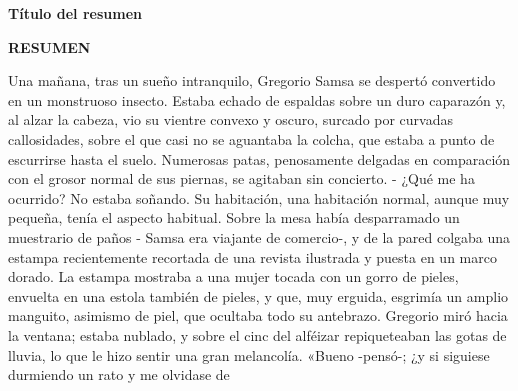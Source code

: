 \begin{center}
{\Large \bfseries Título del resumen}

\vspace{1cm}
{\Large \bfseries RESUMEN}

\vspace{2.5cm}
\end{center}


Una mañana, tras un sueño intranquilo, Gregorio Samsa se despertó convertido en un monstruoso insecto. Estaba echado de espaldas sobre un duro caparazón y, al alzar la cabeza, vio su vientre convexo y oscuro, surcado por curvadas callosidades, sobre el que casi no se aguantaba la colcha, que estaba a punto de escurrirse hasta el suelo. Numerosas patas, penosamente delgadas en comparación con el grosor normal de sus piernas, se agitaban sin concierto. - ¿Qué me ha ocurrido? No estaba soñando. Su habitación, una habitación normal, aunque muy pequeña, tenía el aspecto habitual. Sobre la mesa había desparramado un muestrario de paños - Samsa era viajante de comercio-, y de la pared colgaba una estampa recientemente recortada de una revista ilustrada y puesta en un marco dorado. La estampa mostraba a una mujer tocada con un gorro de pieles, envuelta en una estola también de pieles, y que, muy erguida, esgrimía un amplio manguito, asimismo de piel, que ocultaba todo su antebrazo. Gregorio miró hacia la ventana; estaba nublado, y sobre el cinc del alféizar repiqueteaban las gotas de lluvia, lo que le hizo sentir una gran melancolía. «Bueno -pensó-; ¿y si siguiese durmiendo un rato y me olvidase de